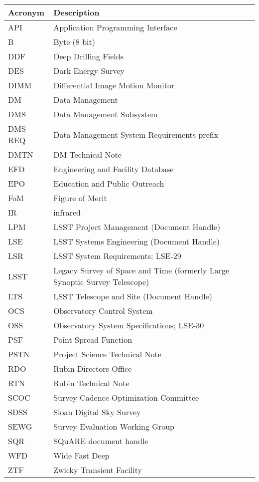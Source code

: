 \addtocounter{table}{-1}
\begin{longtable}{p{}p{}}\hline
\textbf{Acronym} & \textbf{Description}  \\\hline

API & Application Programming Interface \\\hline
B & Byte (8 bit) \\\hline
DDF & Deep Drilling Fields \\\hline
DES & Dark Energy Survey \\\hline
DIMM & Differential Image Motion Monitor \\\hline
DM & Data Management \\\hline
DMS & Data Management Subsystem \\\hline
DMS-REQ & Data Management System Requirements prefix \\\hline
DMTN & DM Technical Note \\\hline
EFD & Engineering and Facility Database \\\hline
EPO & Education and Public Outreach \\\hline
FoM & Figure of Merit \\\hline
IR & infrared \\\hline
LPM & LSST Project Management (Document Handle) \\\hline
LSE & LSST Systems Engineering (Document Handle) \\\hline
LSR & LSST System Requirements; LSE-29 \\\hline
LSST & Legacy Survey of Space and Time (formerly Large Synoptic Survey Telescope) \\\hline
LTS & LSST Telescope and Site  (Document Handle) \\\hline
OCS & Observatory Control System \\\hline
OSS & Observatory System Specifications; LSE-30 \\\hline
PSF & Point Spread Function \\\hline
PSTN & Project Science Technical Note \\\hline
RDO & Rubin Directors Office \\\hline
RTN & Rubin Technical Note \\\hline
SCOC & Survey Cadence Optimization Committee \\\hline
SDSS & Sloan Digital Sky Survey \\\hline
SEWG & Survey Evaluation Working Group \\\hline
SQR & SQuARE document handle \\\hline
WFD & Wide Fast Deep \\\hline
ZTF & Zwicky Transient Facility \\\hline
\end{longtable}
